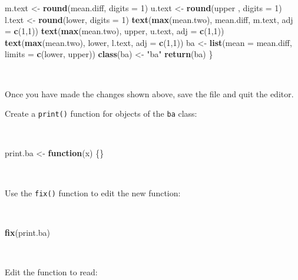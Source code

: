 \documentclass[12pt,a4paper]{book}
\newenvironment{Shaded}{\begin{snugshade}}{\end{snugshade}}
\newcommand{\KeywordTok}[1]{\textcolor[rgb]{0.13,0.29,0.53}{\textbf{#1}}}
\newcommand{\DataTypeTok}[1]{\textcolor[rgb]{0.13,0.29,0.53}{#1}}
\newcommand{\DecValTok}[1]{\textcolor[rgb]{0.00,0.00,0.81}{#1}}
\newcommand{\StringTok}[1]{\textcolor[rgb]{0.31,0.60,0.02}{#1}}
\newcommand{\ControlFlowTok}[1]{\textcolor[rgb]{0.13,0.29,0.53}{\textbf{#1}}}
\newcommand{\NormalTok}[1]{#1}
\theoremstyle{definition}
\theoremstyle{definition}
\theoremstyle{definition}
\theoremstyle{remark}
\begin{document}
\begin{Shaded}
\begin{Highlighting}[]
\NormalTok{  m.text <-}\StringTok{ }\KeywordTok{round}\NormalTok{(mean.diff, }\DataTypeTok{digits =} \DecValTok{1}\NormalTok{)}
\NormalTok{  u.text <-}\StringTok{ }\KeywordTok{round}\NormalTok{(upper , }\DataTypeTok{digits =} \DecValTok{1}\NormalTok{)}
\NormalTok{  l.text <-}\StringTok{ }\KeywordTok{round}\NormalTok{(lower, }\DataTypeTok{digits =} \DecValTok{1}\NormalTok{)}
  \KeywordTok{text}\NormalTok{(}\KeywordTok{max}\NormalTok{(mean.two), mean.diff, m.text, }\DataTypeTok{adj =} \KeywordTok{c}\NormalTok{(}\DecValTok{1}\NormalTok{,}\DecValTok{1}\NormalTok{)) }
  \KeywordTok{text}\NormalTok{(}\KeywordTok{max}\NormalTok{(mean.two), upper, u.text, }\DataTypeTok{adj =} \KeywordTok{c}\NormalTok{(}\DecValTok{1}\NormalTok{,}\DecValTok{1}\NormalTok{)) }
  \KeywordTok{text}\NormalTok{(}\KeywordTok{max}\NormalTok{(mean.two), lower, l.text, }\DataTypeTok{adj =} \KeywordTok{c}\NormalTok{(}\DecValTok{1}\NormalTok{,}\DecValTok{1}\NormalTok{))}
\NormalTok{  ba <-}\StringTok{ }\KeywordTok{list}\NormalTok{(}\DataTypeTok{mean =}\NormalTok{ mean.diff, }\DataTypeTok{limits =} \KeywordTok{c}\NormalTok{(lower, upper))}
  \KeywordTok{class}\NormalTok{(ba) <-}\StringTok{ "ba"}
  \KeywordTok{return}\NormalTok{(ba)}
\NormalTok{\}}
\end{Highlighting}
\end{Shaded}

~

Once you have made the changes shown above, save the file and quit the
editor.

Create a \texttt{print()} function for objects of the \texttt{ba} class:

~

\begin{Shaded}
\begin{Highlighting}[]
\NormalTok{print.ba <-}\StringTok{ }\ControlFlowTok{function}\NormalTok{(x) \{\}}
\end{Highlighting}
\end{Shaded}

~

Use the \texttt{fix()} function to edit the new function:

~

\begin{Shaded}
\begin{Highlighting}[]
\KeywordTok{fix}\NormalTok{(print.ba)}
\end{Highlighting}
\end{Shaded}

~

Edit the function to read:
\end{document}
